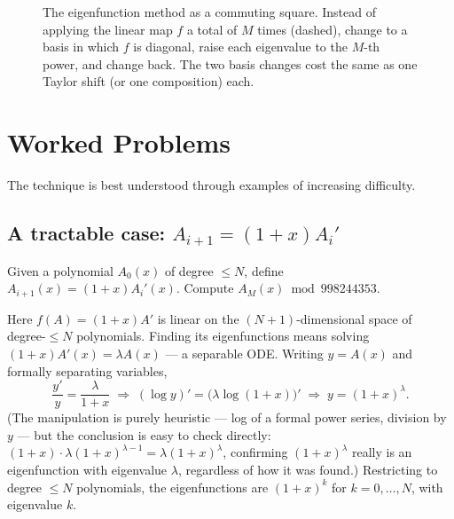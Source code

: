 \documentclass[11pt]{article}
\begin{document}
\begin{figure}[H]
\centering
{}
\caption{The eigenfunction method as a commuting square. Instead of applying the linear map $f$ a total of $M$ times (dashed), change to a basis in which $f$ is diagonal, raise each eigenvalue to the $M$-th power, and change back. The two basis changes cost the same as one Taylor shift (or one composition) each.}\label{fig:eig_square}
\end{figure}

\section{Worked Problems}
The technique is best understood through examples of increasing
difficulty.

\subsection{A tractable case: \texorpdfstring{$A_{i+1}=(1+x)A_i'$}{A\_{i+1}=(1+x)A\_i'}}
\begin{definitionbox}
Given a polynomial $A_0(x)$ of degree $\le N$, define
$A_{i+1}(x) = (1+x)A_i'(x)$. Compute $A_M(x) \bmod 998244353$.
\end{definitionbox}

Here $f(A) = (1+x)A'$ is linear on the $(N{+}1)$-dimensional space of
degree-$\le N$ polynomials. Finding its eigenfunctions means solving
$(1+x)A'(x) = \lambda A(x)$ --- a separable ODE. Writing $y = A(x)$ and
formally separating variables,
\[
  \frac{y'}{y} = \frac{\lambda}{1+x}
  \;\Longrightarrow\;
  (\log y)' = \bigl(\lambda \log(1+x)\bigr)'
  \;\Longrightarrow\;
  y = (1+x)^\lambda .
\]
(The manipulation is purely heuristic --- log of a formal power series,
division by $y$ --- but the conclusion is easy to check directly:
$(1+x)\cdot\lambda(1+x)^{\lambda-1} = \lambda(1+x)^\lambda$, confirming
$(1+x)^\lambda$ really is an eigenfunction with eigenvalue $\lambda$,
regardless of how it was found.) Restricting to degree $\le N$
polynomials, the eigenfunctions are $(1+x)^k$ for $k=0,\ldots,N$, with
eigenvalue $k$.
\end{document}
